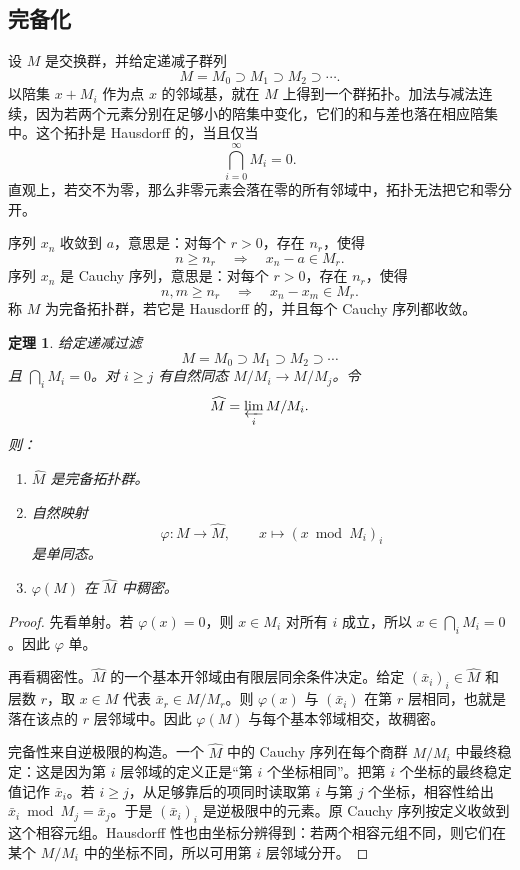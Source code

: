 \documentclass[11pt,a4paper,openany]{ctexbook}
\numberwithin{equation}{chapter}
\theoremstyle{plain}
\newtheorem{theorem}{定理}[chapter]
\theoremstyle{definition}
\theoremstyle{remark}
\begin{document}
\subsection{完备化}

设 $M$ 是交换群，并给定递减子群列
\[
M=M_0\supset M_1\supset M_2\supset\cdots.
\]
以陪集 $x+M_i$ 作为点 $x$ 的邻域基，就在 $M$ 上得到一个群拓扑。加法与减法连续，因为若两个元素分别在足够小的陪集中变化，它们的和与差也落在相应陪集中。这个拓扑是 Hausdorff 的，当且仅当
\[
\bigcap_{i=0}^\infty M_i=0.
\]
直观上，若交不为零，那么非零元素会落在零的所有邻域中，拓扑无法把它和零分开。

序列 $x_n$ 收敛到 $a$，意思是：对每个 $r>0$，存在 $n_r$，使得
\[
n\ge n_r\quad\Longrightarrow\quad x_n-a\in M_r.
\]
序列 $x_n$ 是 Cauchy 序列，意思是：对每个 $r>0$，存在 $n_r$，使得
\[
n,m\ge n_r\quad\Longrightarrow\quad x_n-x_m\in M_r.
\]
称 $M$ 为完备拓扑群，若它是 Hausdorff 的，并且每个 Cauchy 序列都收敛。

\begin{theorem}
给定递减过滤
\[
M=M_0\supset M_1\supset M_2\supset\cdots
\]
且 $\bigcap_iM_i=0$。对 $i\ge j$ 有自然同态 $M/M_i\to M/M_j$。令
\[
\widehat M=\varprojlim_i M/M_i.
\]
则：
\begin{enumerate}[label=(\arabic*)]
\item $\widehat M$ 是完备拓扑群。
\item 自然映射
\[
\varphi:M\longrightarrow \widehat M,\qquad x\longmapsto (x\bmod M_i)_i
\]
是单同态。
\item $\varphi(M)$ 在 $\widehat M$ 中稠密。
\end{enumerate}
\end{theorem}

\begin{proof}
先看单射。若 $\varphi(x)=0$，则 $x\in M_i$ 对所有 $i$ 成立，所以 $x\in\bigcap_iM_i=0$。因此 $\varphi$ 单。

再看稠密性。$\widehat M$ 的一个基本开邻域由有限层同余条件决定。给定 $(\bar x_i)_i\in\widehat M$ 和层数 $r$，取 $x\in M$ 代表 $\bar x_r\in M/M_r$。则 $\varphi(x)$ 与 $(\bar x_i)$ 在第 $r$ 层相同，也就是落在该点的 $r$ 层邻域中。因此 $\varphi(M)$ 与每个基本邻域相交，故稠密。

完备性来自逆极限的构造。一个 $\widehat M$ 中的 Cauchy 序列在每个商群 $M/M_i$ 中最终稳定：这是因为第 $i$ 层邻域的定义正是“第 $i$ 个坐标相同”。把第 $i$ 个坐标的最终稳定值记作 $\bar x_i$。若 $i\ge j$，从足够靠后的项同时读取第 $i$ 与第 $j$ 个坐标，相容性给出 $\bar x_i\bmod M_j=\bar x_j$。于是 $(\bar x_i)_i$ 是逆极限中的元素。原 Cauchy 序列按定义收敛到这个相容元组。Hausdorff 性也由坐标分辨得到：若两个相容元组不同，则它们在某个 $M/M_i$ 中的坐标不同，所以可用第 $i$ 层邻域分开。
\end{proof}
\end{document}
